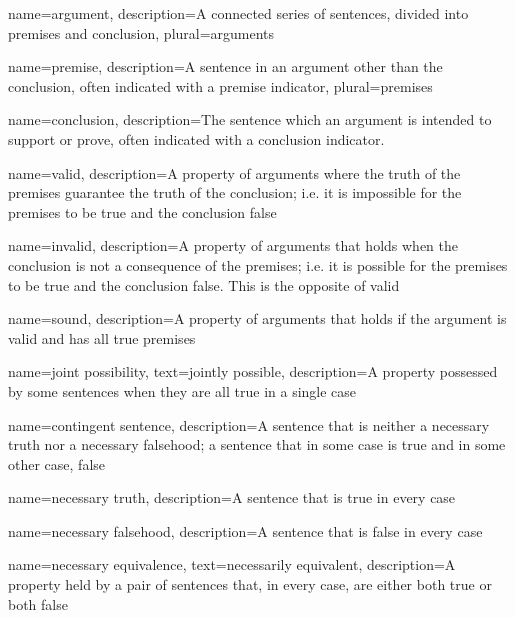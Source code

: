 {
name=argument,
description={A connected series of sentences, divided into \gls{premise}s and \gls{conclusion}},
plural=arguments
}

{
name=premise,
description={A sentence in an \gls{argument} other than the \gls{conclusion}, often indicated with a premise indicator},
plural=premises
}

{
name=conclusion,
description={The sentence which an argument is intended to support or prove, often indicated with a conclusion indicator.}
}

{
name=valid,
description={A property of arguments where the truth of the premises guarantee the truth of the conclusion; i.e. it is impossible for the premises to be true and the conclusion false}
}

{
name=invalid,
description={A property of arguments that holds when the conclusion is not a consequence of the premises; i.e. it is possible for the premises to be true and the conclusion false. This is the opposite of \gls{valid}}
}

{
name=sound,
description={A property of arguments that holds if the argument is valid and has all true premises}
}


{
name=joint possibility,
text={jointly possible},
description={A property possessed by some sentences when they are all true in a single case}
}

{
name=contingent sentence,
description={A sentence that is neither a \gls{necessary truth} nor a \gls{necessary falsehood}; a sentence that in some case is true and in some other case, false}
}

{
name={necessary truth},
description={A sentence that is true in every case}
}

{
name={necessary falsehood},
description={A sentence that is false in every case}
}


{
name={necessary equivalence},
text={necessarily equivalent},
description={A property held by a pair of sentences that, in every case, are either both true or both false}
}